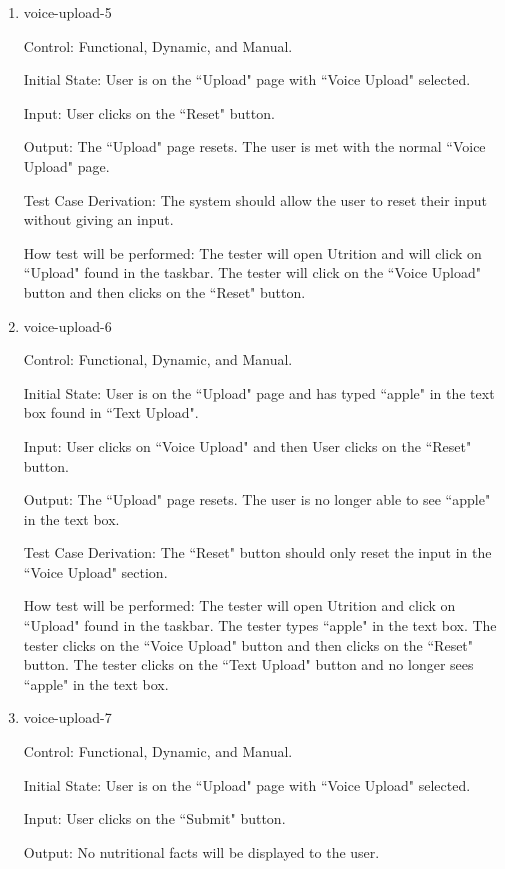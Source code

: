 \documentclass[12pt, titlepage]{article}
\begin{document}
\begin{enumerate}
	\item{voice-upload-5\\}
	
	Control: Functional, Dynamic, and Manual.
	
	Initial State: User is on the ``Upload" page with ``Voice Upload" selected.
	
	Input: User clicks on the ``Reset" button.
	
	Output: The ``Upload" page resets. The user is met with the normal ``Voice Upload" page.
	
	Test Case Derivation: The system should allow the user to reset their input without giving an input.
	
	How test will be performed: The tester will open Utrition and will click on ``Upload" found in the taskbar. The tester will click on the ``Voice Upload" button and then clicks on the ``Reset" button. 
	
	\item{voice-upload-6\\}
	
	Control: Functional, Dynamic, and Manual.
	
	Initial State: User is on the ``Upload" page and has typed ``apple" in the text box found in ``Text Upload".
	
	Input: User clicks on ``Voice Upload" and then User clicks on the ``Reset" button.
	
	Output: The ``Upload" page resets. The user is no longer able to see ``apple" in the text box.
	
	Test Case Derivation: The ``Reset" button should only reset the input in the ``Voice Upload" section.
	
	How test will be performed: The tester will open Utrition and click on ``Upload" found in the taskbar. The tester types ``apple" in the text box. The tester clicks on the ``Voice Upload" button and then clicks on the ``Reset" button. The tester clicks on the ``Text Upload" button and no longer sees ``apple" in the text box.
	
	\item{voice-upload-7\\}
	
	Control: Functional, Dynamic, and Manual.
	
	Initial State: User is on the ``Upload" page with ``Voice Upload" selected.
	
	Input: User clicks on the ``Submit" button.
	
	Output: No nutritional facts will be displayed to the user.
	

\end{enumerate}
\end{document}
